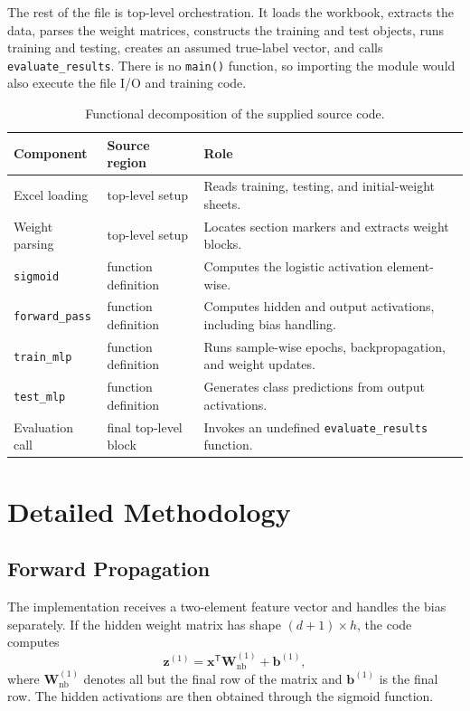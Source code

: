 \documentclass[11pt,a4paper]{article}
\newcommand{\code}[1]{\texttt{\small #1}}
\begin{document}
The rest of the file is top-level orchestration. It loads the workbook, extracts the data, parses the weight matrices, constructs the training and test objects, runs training and testing, creates an assumed true-label vector, and calls \code{evaluate\_results}. There is no \code{main()} function, so importing the module would also execute the file I/O and training code.

\begin{table}[ht]
\centering
\small
\begin{tabular}{p{}p{}p{}}
\toprule
\textbf{Component} & \textbf{Source region} & \textbf{Role}\\
\midrule
Excel loading & top-level setup & Reads training, testing, and initial-weight sheets.\\
Weight parsing & top-level setup & Locates section markers and extracts weight blocks.\\
\code{sigmoid} & function definition & Computes the logistic activation element-wise.\\
\code{forward\_pass} & function definition & Computes hidden and output activations, including bias handling.\\
\code{train\_mlp} & function definition & Runs sample-wise epochs, backpropagation, and weight updates.\\
\code{test\_mlp} & function definition & Generates class predictions from output activations.\\
Evaluation call & final top-level block & Invokes an undefined \code{evaluate\_results} function.\\
\bottomrule
\end{tabular}
\caption{Functional decomposition of the supplied source code.}
\end{table}

\section{Detailed Methodology}
\subsection{Forward Propagation}
The implementation receives a two-element feature vector and handles the bias separately. If the hidden weight matrix has shape \((d+1)\times h\), the code computes
\begin{equation}
\mathbf{z}^{(1)} = \mathbf{x}^{\mathsf T}\mathbf{W}^{(1)}_{\mathrm{nb}} + \mathbf{b}^{(1)},
\end{equation}
where \(\mathbf{W}^{(1)}_{\mathrm{nb}}\) denotes all but the final row of the matrix and \(\mathbf{b}^{(1)}\) is the final row. The hidden activations are then obtained through the sigmoid function.
\end{document}
